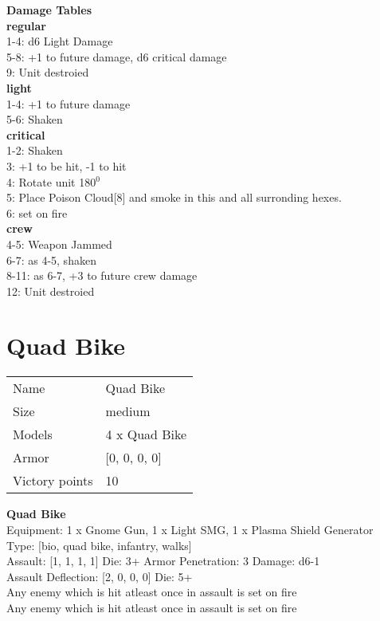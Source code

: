 {\bf Damage Tables} \\
 {\bf regular } \\
1-4: d6 Light Damage \\
5-8: +1 to future damage, d6 critical damage \\
9: Unit destroied \\
 {\bf light } \\
1-4: +1 to future damage \\
5-6: Shaken \\
 {\bf critical } \\
1-2: Shaken \\
3: +1 to be hit, -1 to hit \\
4: Rotate unit 180$^0$ \\
5: Place Poison Cloud[8] and smoke in this and all surronding hexes. \\
6: set on fire \\
 {\bf crew } \\
4-5: Weapon Jammed \\
6-7: as 4-5, shaken \\
8-11: as 6-7, +3 to future crew damage \\
12: Unit destroied \\










\pagebreak\pagebreak

\section{ Quad Bike }

\begin{tabular}{ll}
  Name & Quad Bike \\
  Size & medium\\
  Models & 4 x Quad Bike\\
  Armor & [0, 0, 0, 0]\\
  Victory points & 10\\
\end{tabular}



{\bf Quad Bike } \\
Equipment: 1 x Gnome Gun, 1 x Light SMG, 1 x Plasma Shield Generator \\
Type: [bio, quad bike, infantry, walks] \\

Assault: [1, 1, 1, 1] Die: 3+ Armor Penetration: 3 Damage: d6-1 \\
Assault Deflection: [2, 0, 0, 0] Die: 5+\\
\indent Any enemy which is hit atleast once in assault is set on fire\\ 
Any enemy which is hit atleast once in assault is set on fire\\ 


